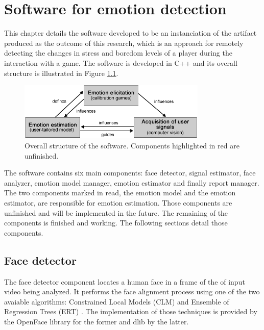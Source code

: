 \chapter{Software for emotion detection}
\label{ch:software}

This chapter details the software developed to be an instanciation of the artifact produced as the outcome of this research, which is an approach for remotely detecting the changes in stress and boredom levels of a player during the interaction with a game. The software is developed in C++ and its overall structure is illustrated in Figure \ref{fig:tool-overall-structure}.

\begin{figure}[h]
    \centering
    \includegraphics[width=0.8\textwidth]{figures/method-components-dependency.png}
    \caption{Overall structure of the software. Components highlighted in red are unfinished.}
    \label{fig:tool-overall-structure}
\end{figure}

The software contains six main components: face detector, signal estimator, face analyzer, emotion model manager, emotion estimator and finally report manager. The two components marked in read, the emotion model and the emotion estimator, are responsible for emotion estimation. Those components are unfinished and will be implemented in the future. The remaining of the components is finished and working. The following sections detail those components.

\section{Face detector}

The face detector component locates a human face in a frame of the of input video being analyzed. It performs the face alignment process using one of the two avaiable algorithms: Constrained Local Models (CLM) \parencite{cristinacce2006feature} and Ensemble of Regression Trees (ERT) \parencite{kazemi2014one}. The implementation of those techniques is provided by the OpenFace library \parencite{openface} for the former and dlib \parencite{dlib} by the latter.

